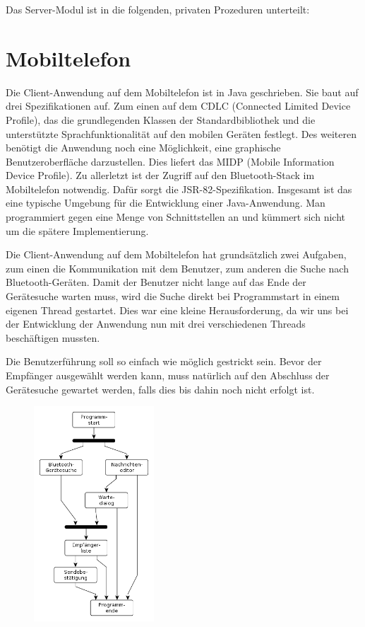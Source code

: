 \documentclass[ngerman]{article}
\begin{document}
Das Server-Modul ist in die folgenden, privaten Prozeduren unterteilt:



\section{Mobiltelefon}

Die Client-Anwendung auf dem Mobiltelefon ist in Java geschrieben. Sie baut auf
drei Spezifikationen auf. Zum einen auf dem CDLC (Connected Limited Device
Profile), das die grundlegenden Klassen der Standardbibliothek und die
unterstützte Sprachfunktionalität auf den mobilen Geräten festlegt. Des
weiteren benötigt die Anwendung noch eine Möglichkeit, eine graphische
Benutzeroberfläche darzustellen. Dies liefert das MIDP (Mobile Information
Device Profile). Zu allerletzt ist der Zugriff auf den Bluetooth-Stack im
Mobiltelefon notwendig.  Dafür sorgt die JSR-82-Spezifikation. Insgesamt ist
das eine typische Umgebung für die Entwicklung einer Java-Anwendung. Man
programmiert gegen eine Menge von Schnittstellen an und kümmert sich nicht um
die spätere Implementierung.

Die Client-Anwendung auf dem Mobiltelefon hat grundsätzlich zwei Aufgaben, zum
einen die Kommunikation mit dem Benutzer, zum anderen die Suche nach
Bluetooth-Geräten. Damit der Benutzer nicht lange auf das Ende der Gerätesuche
warten muss, wird die Suche direkt bei Programmstart in einem eigenen Thread
gestartet. Dies war eine kleine Herausforderung, da wir uns bei der Entwicklung
der Anwendung nun mit drei verschiedenen Threads beschäftigen mussten.

Die Benutzerführung soll so einfach wie möglich gestrickt sein. Bevor der
Em\-pfänger ausgewählt werden kann, muss natürlich auf den Abschluss der
Ge\-rä\-te\-suche gewartet werden, falls dies bis dahin noch nicht erfolgt ist.

\begin{figure}[h!] \begin{center}
    \includegraphics[width=0.4\textwidth]{media/mobile-client-flow}
\end{center} \end{figure}
\end{document}
